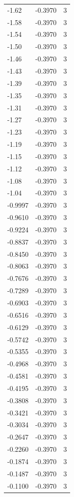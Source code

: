 \begin{longtable}{lrr}
  -1.62 & -0.3970 & 3 \\
  -1.58 & -0.3970 & 3 \\
  -1.54 & -0.3970 & 3 \\
  -1.50 & -0.3970 & 3 \\
  -1.46 & -0.3970 & 3 \\
  -1.43 & -0.3970 & 3 \\
  -1.39 & -0.3970 & 3 \\
  -1.35 & -0.3970 & 3 \\
  -1.31 & -0.3970 & 3 \\
  -1.27 & -0.3970 & 3 \\
  -1.23 & -0.3970 & 3 \\
  -1.19 & -0.3970 & 3 \\
  -1.15 & -0.3970 & 3 \\
  -1.12 & -0.3970 & 3 \\
  -1.08 & -0.3970 & 3 \\
  -1.04 & -0.3970 & 3 \\
  -0.9997 & -0.3970 & 3 \\
  -0.9610 & -0.3970 & 3 \\
  -0.9224 & -0.3970 & 3 \\
  -0.8837 & -0.3970 & 3 \\
  -0.8450 & -0.3970 & 3 \\
  -0.8063 & -0.3970 & 3 \\
  -0.7676 & -0.3970 & 3 \\
  -0.7289 & -0.3970 & 3 \\
  -0.6903 & -0.3970 & 3 \\
  -0.6516 & -0.3970 & 3 \\
  -0.6129 & -0.3970 & 3 \\
  -0.5742 & -0.3970 & 3 \\
  -0.5355 & -0.3970 & 3 \\
  -0.4968 & -0.3970 & 3 \\
  -0.4581 & -0.3970 & 3 \\
  -0.4195 & -0.3970 & 3 \\
  -0.3808 & -0.3970 & 3 \\
  -0.3421 & -0.3970 & 3 \\
  -0.3034 & -0.3970 & 3 \\
  -0.2647 & -0.3970 & 3 \\
  -0.2260 & -0.3970 & 3 \\
  -0.1874 & -0.3970 & 3 \\
  -0.1487 & -0.3970 & 3 \\
  -0.1100 & -0.3970 & 3 \\

\end{longtable}
